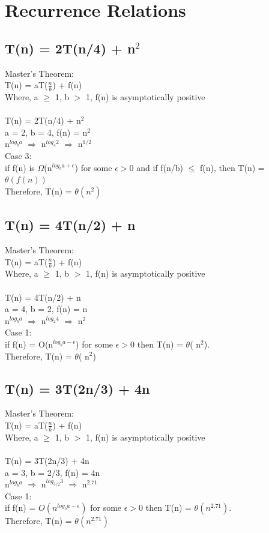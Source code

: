 \documentclass[10pt,letterpaper]{article}
\begin{document}
\section{Recurrence Relations}
\subsection{T(n) = 2T(n/4) + n$^{2}$}
Master's Theorem:\\
T(n) = aT($\frac{n}{b}$) + f(n)\\
Where, a $\geq$ 1, b $>$ 1, f(n) is asymptotically positive\\
\\
T(n) = 2T(n/4) + n$^{2}$\\
a = 2, b = 4, f(n) = n$^{2}$\\
n$^{log_{b}a}$ $\Rightarrow$ n$^{log_{4}2}$ $\Rightarrow$ n$^{1/2}$\\
Case 3:\\
if f(n) is $\Omega$(n$^{log_{b}a + \epsilon}$) for some $\epsilon > 0$ and if f(n/b) $\leq$ f(n), then T(n) = $\theta(f(n))$\\
Therefore, T(n) = $\theta(n^{2})$

\subsection{T(n) = 4T(n/2) + n}
Master's Theorem:\\
T(n) = aT($\frac{n}{b}$) + f(n)\\
Where, a $\geq$ 1, b $>$ 1, f(n) is asymptotically positive\\
\\
T(n) = 4T(n/2) + n\\
a = 4, b = 2, f(n) = n\\
n$^{log_{b}a}$ $\Rightarrow$ n$^{log_{2}4}$ $\Rightarrow$ n$^{2}$\\
Case 1:\\
if f(n) = O(n$^{log_{b}a - \epsilon}$) for some $\epsilon > 0$ then T(n) = $\theta$( n$^{2}$).\\
Therefore, T(n) =  $\theta$( n$^{2}$)

\subsection{T(n) = 3T(2n/3) + 4n}
Master's Theorem:\\
T(n) = aT($\frac{n}{b}$) + f(n)\\
Where, a $\geq$ 1, b $>$ 1, f(n) is asymptotically positive\\
\\
T(n) = 3T(2n/3) + 4n\\
a = 3, b = 2/3, f(n) = 4n\\
n$^{log_{b}a}$ $\Rightarrow$ n$^{log_{3/2}3}$ $\Rightarrow$ n$^{2.71}$\\
Case 1:\\
if f(n) = $O(n^{log_{b}a - \epsilon})$ for some $\epsilon > 0$ then T(n) = $\theta(n^{2.71})$.\\
Therefore, T(n) =  $\theta(n^{2.71})$
\end{document}
